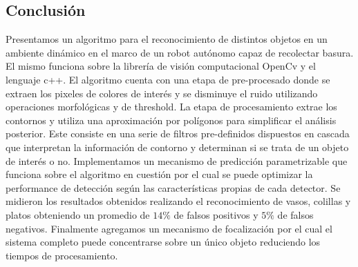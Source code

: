 \subsection{Conclusi\'on}
Presentamos un algoritmo para el reconocimiento de distintos objetos en 
un ambiente dinámico en el marco de un robot autónomo capaz de 
recolectar basura. El mismo funciona sobre la librería de visión 
computacional OpenCv y el lenguaje c++.  El algoritmo cuenta
con una etapa de pre-procesado donde se extraen los pixeles de colores de interés y se disminuye el ruido utilizando 
operaciones morfológicas y de threshold. La etapa de procesamiento extrae los contornos y utiliza una aproximación por polígonos
para simplificar el análisis posterior. Este consiste en una serie de 
filtros pre-definidos dispuestos en cascada que interpretan la 
información de contorno y  determinan si se trata 
de un objeto de interés o no. 
Implementamos un mecanismo de predicción parametrizable que funciona 
sobre el algoritmo en cuestión por el cual se puede optimizar la performance de 
detección según las características propias de cada detector. Se 
midieron los resultados obtenidos realizando el reconocimiento de 
vasos, colillas y platos obteniendo un promedio de $14\%$ de falsos 
positivos  y $5\%$ de falsos negativos. Finalmente agregamos un mecanismo de focalización por el cual 
el sistema completo puede concentrarse sobre un único objeto reduciendo 
los tiempos de procesamiento. 


